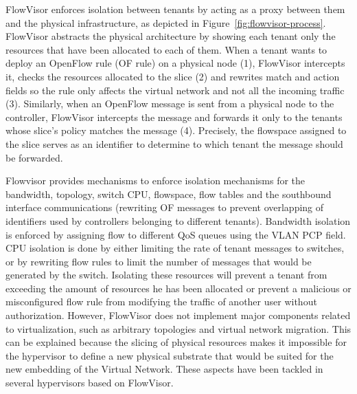 FlowVisor enforces isolation between tenants by acting as a proxy between them and the physical infrastructure, as depicted in Figure~\ref{fig:flowvisor-process}.
FlowVisor abstracts the physical architecture by showing each tenant only the resources that have been allocated to each of them.
When a tenant wants to deploy an OpenFlow rule (OF rule) on a physical node (1), FlowVisor intercepts it, checks the resources allocated to the slice (2) and rewrites match and action fields so the rule only affects the virtual network and not all the incoming traffic (3).
Similarly, when an OpenFlow message is sent from a physical node to the controller, FlowVisor intercepts the message and forwards it only to the tenants whose slice's policy matches the message (4).
Precisely, the flowspace assigned to the slice serves as an identifier to determine to which tenant the message should be forwarded.

Flowvisor provides mechanisms to enforce isolation mechanisms for the bandwidth, topology, switch CPU, flowspace, flow tables and the southbound interface communications (\ie rewriting OF messages to prevent overlapping of identifiers used by controllers belonging to different tenants).
Bandwidth isolation is enforced by assigning flow to different QoS queues using the VLAN PCP field.
CPU isolation is done by either limiting the rate of tenant messages to switches, or by rewriting flow rules to limit the number of messages that would be generated by the switch.
Isolating these resources will prevent a tenant from exceeding the amount of resources he has been allocated or prevent a malicious or misconfigured flow rule from modifying the traffic of another user without authorization.
However, FlowVisor does not implement major components related to virtualization, such as arbitrary topologies and virtual network migration.
This can be explained because the slicing of physical resources makes it impossible for the hypervisor to define a new physical substrate that would be suited for the new embedding of the Virtual Network.
These aspects have been tackled in several hypervisors based on FlowVisor.

